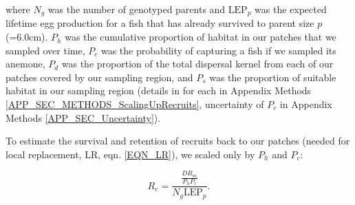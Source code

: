 \documentclass[12pt, oneside]{article}   	%
\begin{document}
where $N_g$ was the number of genotyped parents and $\text{LEP}_p$ was the expected lifetime egg production for a fish that has already survived to parent size $p$ (=6.0cm). $P_h$ was the cumulative proportion of habitat in our patches that we sampled over time, $P_c$ was the probability of capturing a fish if we sampled its anemone, $P_d$ was the proportion of the total dispersal kernel from each of our patches covered by our sampling region, and $P_s$ was the proportion of suitable habitat in our sampling region (details in for each in Appendix Methods \ref{APP_SEC_METHODS_ScalingUpRecruits}, uncertainty of $P_c$ in Appendix Methods \ref{APP_SEC_Uncertainty}).

To estimate the survival and retention of recruits back to our patches (needed for local replacement, LR, eqn. \ref{EQN_LR}), we scaled only by $P_h$ and $P_c$: 

\begin{equation}
R_e = \frac{\frac{D R_m}{P_h P_c}}{N_g \text{LEP}_p}. \label{EQN_Re}
\end{equation}

\end{document}
